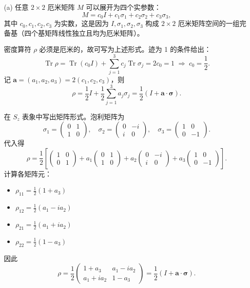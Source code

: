\begin{solution}
(a) 任意 $2\times2$ 厄米矩阵 $M$ 可以展开为四个实参数：
\[
M = c_0 I + c_1\sigma_1 + c_2\sigma_2 + c_3\sigma_3,
\]
其中 $c_0,c_1,c_2,c_3$ 为实数，这是因为 $I,\sigma_1,\sigma_2,\sigma_3$ 构成 $2\times2$ 厄米矩阵空间的一组完备基（四个基矩阵线性独立且均为厄米矩阵）。

密度算符 $\rho$ 必须是厄米的，故可写为上述形式。迹为 1 的条件给出：
\[
\operatorname{Tr}\rho = \operatorname{Tr}(c_0 I) + \sum_{j=1}^3 c_j\operatorname{Tr}\sigma_j = 2c_0 = 1 \;\Longrightarrow\; c_0 = \frac12.
\]
记 $\mathbf a = (a_1,a_2,a_3) = 2(c_1,c_2,c_3)$，则
\[
\rho = \frac12 I + \frac12\sum_{j=1}^3 a_j\sigma_j = \frac12(I + \mathbf a\cdot\boldsymbol\sigma).
\]

在 $S_z$ 表象中写出矩阵形式。泡利矩阵为
\[
\sigma_1 = \begin{pmatrix}0&1\\1&0\end{pmatrix},\quad
\sigma_2 = \begin{pmatrix}0&-i\\i&0\end{pmatrix},\quad
\sigma_3 = \begin{pmatrix}1&0\\0&-1\end{pmatrix}.
\]
代入得
\[
\rho = \frac12\left[
\begin{pmatrix}1&0\\0&1\end{pmatrix}
+ a_1\begin{pmatrix}0&1\\1&0\end{pmatrix}
+ a_2\begin{pmatrix}0&-i\\i&0\end{pmatrix}
+ a_3\begin{pmatrix}1&0\\0&-1\end{pmatrix}
\right].
\]
计算各矩阵元：
\begin{itemize}
\item $\rho_{11} = \frac12(1 + a_3)$
\item $\rho_{12} = \frac12(a_1 - i a_2)$
\item $\rho_{21} = \frac12(a_1 + i a_2)$
\item $\rho_{22} = \frac12(1 - a_3)$
\end{itemize}
因此
\[
\boxed{\rho = \frac12\begin{pmatrix}
1+a_3 & a_1-ia_2\\
a_1+ia_2 & 1-a_3
\end{pmatrix}
= \frac12(I+\mathbf a\cdot\boldsymbol\sigma).}
\]


\end{solution}
